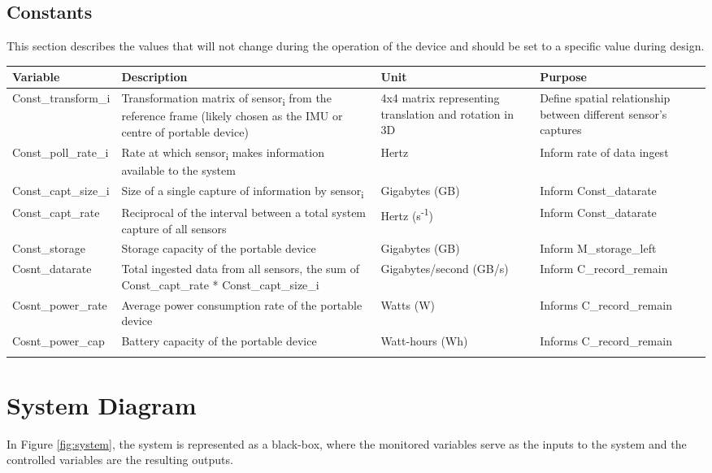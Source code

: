 \documentclass[11pt]{article}
\begin{document}
		
			\subsection{Constants} 
			This section describes the values that will not change during the operation of the device and should be set to a specific value during design.
			
			\begin{tabularx}{\textwidth}{X X X X}
				\toprule
				\textbf{Variable} & \textbf{Description} & \textbf{Unit} & \textbf{Purpose}\\
				\midrule
				Const\_transform\_i & Transformation matrix of sensor\textsubscript{i} from the reference frame (likely chosen as the IMU or centre of portable device) & 4x4 matrix representing translation and rotation in 3D & Define spatial relationship between different sensor's captures \\
				\midrule
				Const\_poll\_rate\_i & Rate at which sensor\textsubscript{i} makes information available to the system & Hertz & Inform rate of data ingest\\
				\midrule
				Const\_capt\_size\_i & Size of a single capture of information by sensor\textsubscript{i} & Gigabytes (GB) & Inform Const\_datarate \\
				\midrule
				Const\_capt\_rate & Reciprocal of the interval between a total system capture of all sensors & Hertz (s\textsuperscript{-1}) & Inform Const\_datarate \\
				\midrule
				Const\_storage & Storage capacity of the portable device & Gigabytes (GB) & Inform M\_storage\_left \\
				\midrule
				Cosnt\_datarate & Total ingested data from all sensors, the sum of Const\_capt\_rate * Const\_capt\_size\_i &Gigabytes/second (GB/s) & Inform C\_record\_remain \\
				\midrule
				Cosnt\_power\_rate & Average power consumption rate of the portable device & Watts (W) & Informs C\_record\_remain \\
				\midrule
				Cosnt\_power\_cap & Battery capacity of the portable device & Watt-hours (Wh) & Informs C\_record\_remain  \\
				\bottomrule
				\caption{Constants and its Description}
			\end{tabularx}

		
		\section{System Diagram}
			In Figure \ref{fig:system}, the system is represented as a black-box, where the monitored variables serve as the inputs to the system and the controlled variables are the resulting outputs.
			
\end{document}
